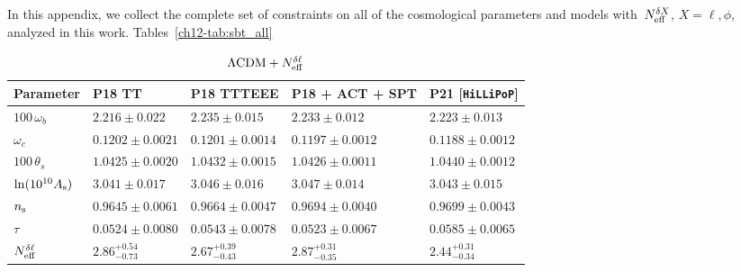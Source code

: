 \begin{subappendices}
In this appendix, we collect the complete set of constraints on all of the cosmological parameters and models with~$N_\mathrm{eff}^{\delta X}$, $X = \ell, \phi$, analyzed in this work. Tables~\ref{ch12-tab:sbt_all}%
\begin{table}
	\centering\footnotesize\setlength{\tabcolsep}{5pt}
	\begin{subtable}{\textwidth}
		\centering


		\begin{tabular}{l l l l l}
				\toprule
			Parameter			& P18 TT					& P18 TTTEEE				& P18 + ACT + SPT			& P21 [\texttt{HiLLiPoP}]	\\
				\midrule[0.065em]
			$100\,\omega_b$		& $2.216 \pm 0.022$			& $2.235 \pm 0.015$			& $2.233 \pm 0.012$			& $2.223 \pm 0.013$			\\
			$\omega_c$			& $0.1202 \pm 0.0021$		& $0.1201 \pm 0.0014$		& $0.1197 \pm 0.0012$		& $0.1188\pm 0.0012$		\\
			$100\,\theta_s$		& $1.0425 \pm 0.0020$		& $1.0432 \pm 0.0015$		& $1.0426 \pm 0.0011$		& $1.0440 \pm 0.0012$		\\
			$\ln(10^{10}A_\mathrm{s})$	& $3.041 \pm 0.017$			& $3.046 \pm 0.016$			& $3.047 \pm 0.014$			& $3.043 \pm 0.015$			\\
			$n_\mathrm{s}$				& $0.9645 \pm 0.0061$		& $0.9664 \pm 0.0047$		& $0.9694 \pm 0.0040$		& $0.9699 \pm 0.0043$		\\
			$\tau$				& $0.0524 \pm 0.0080$		& $0.0543 \pm 0.0078$		& $0.0523 \pm 0.0067$		& $0.0585 \pm 0.0065$		\\
			$N_\mathrm{eff}^{\delta\ell}$		& $2.86^{+0.54}_{-0.73}$	& $2.67^{+0.39}_{-0.43}$	& $2.87^{+0.31}_{-0.35}$	& $2.44^{+0.31}_{-0.34}$	\\
				\bottomrule
		\end{tabular}
	
		\caption{$\Lambda\mathrm{CDM} + N_\mathrm{eff}^{\delta\ell}$}
\end{subtable}\\[4pt]
	\begin{subtable}{\textwidth}
		\centering


\end{subtable}
\end{table}
\end{subappendices}
